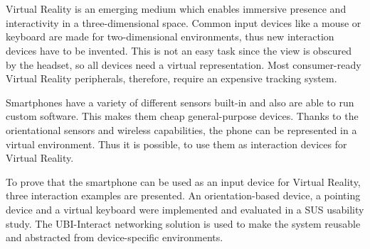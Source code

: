 \chapter{\abstractname}

Virtual Reality is an emerging medium which enables immersive presence and interactivity in a three-dimensional space. Common input devices like a mouse or keyboard are made for two-dimensional environments, thus new interaction devices have to be invented. This is not an easy task since the view is obscured by the headset, so all devices need a virtual representation. Most consumer-ready Virtual Reality peripherals, therefore, require an expensive tracking system.

Smartphones have a variety of different sensors built-in and also are able to run custom software. This makes them cheap general-purpose devices. Thanks to the orientational sensors and wireless capabilities, the phone can be represented in a virtual environment. Thus it is possible, to use them as interaction devices for Virtual Reality.

To prove that the smartphone can be used as an input device for Virtual Reality, three interaction examples are presented. An orientation-based device, a pointing device and a virtual keyboard were implemented and evaluated in a SUS usability study. The UBI-Interact networking solution is used to make the system reusable and abstracted from device-specific environments.